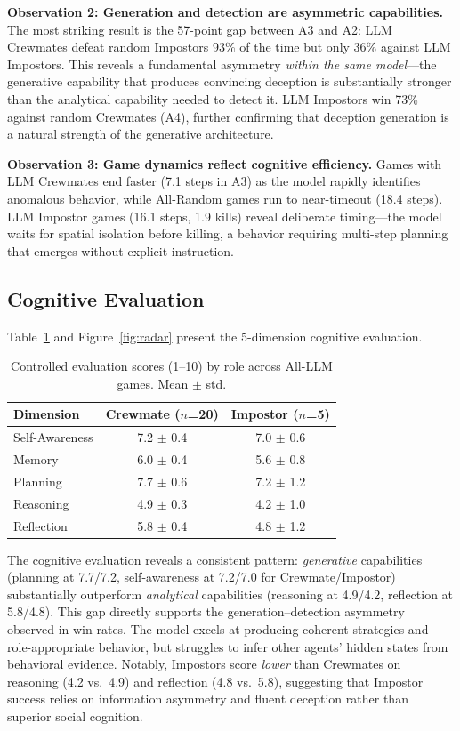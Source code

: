 \documentclass{article}
\begin{document}
\textbf{Observation 2: Generation and detection are asymmetric capabilities.} The most striking result is the 57-point gap between A3 and A2: LLM Crewmates defeat random Impostors 93\% of the time but only 36\% against LLM Impostors. This reveals a fundamental asymmetry \emph{within the same model}---the generative capability that produces convincing deception is substantially stronger than the analytical capability needed to detect it. LLM Impostors win 73\% against random Crewmates (A4), further confirming that deception generation is a natural strength of the generative architecture.

\textbf{Observation 3: Game dynamics reflect cognitive efficiency.} Games with LLM Crewmates end faster (7.1 steps in A3) as the model rapidly identifies anomalous behavior, while All-Random games run to near-timeout (18.4 steps). LLM Impostor games (16.1 steps, 1.9 kills) reveal deliberate timing---the model waits for spatial isolation before killing, a behavior requiring multi-step planning that emerges without explicit instruction.

\subsection{Cognitive Evaluation}

Table~\ref{tab:cognitive} and Figure~\ref{fig:radar} present the 5-dimension cognitive evaluation.

\begin{table}[h]
\centering
\caption{Controlled evaluation scores (1--10) by role across All-LLM games. Mean $\pm$ std.}
\label{tab:cognitive}
\begin{tabular}{lcc}
\toprule
Dimension & Crewmate ($n$=20) & Impostor ($n$=5) \\
\midrule
Self-Awareness & 7.2 $\pm$ 0.4 & 7.0 $\pm$ 0.6 \\
Memory & 6.0 $\pm$ 0.4 & 5.6 $\pm$ 0.8 \\
Planning & 7.7 $\pm$ 0.6 & 7.2 $\pm$ 1.2 \\
Reasoning & 4.9 $\pm$ 0.3 & 4.2 $\pm$ 1.0 \\
Reflection & 5.8 $\pm$ 0.4 & 4.8 $\pm$ 1.2 \\
\bottomrule
\end{tabular}
\end{table}

The cognitive evaluation reveals a consistent pattern: \emph{generative} capabilities (planning at 7.7/7.2, self-awareness at 7.2/7.0 for Crewmate/Impostor) substantially outperform \emph{analytical} capabilities (reasoning at 4.9/4.2, reflection at 5.8/4.8). This gap directly supports the generation--detection asymmetry observed in win rates. The model excels at producing coherent strategies and role-appropriate behavior, but struggles to infer other agents' hidden states from behavioral evidence. Notably, Impostors score \emph{lower} than Crewmates on reasoning (4.2 vs.\ 4.9) and reflection (4.8 vs.\ 5.8), suggesting that Impostor success relies on information asymmetry and fluent deception rather than superior social cognition.
\end{document}
